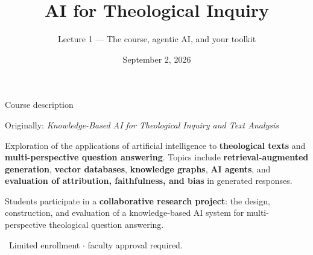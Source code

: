 


\title{AI for Theological Inquiry}
\subtitle{Lecture 1 — The course, agentic AI, and your toolkit}
\date{September 2, 2026}





\begin{frame}{Course description}
  \begin{center}\footnotesize\color{midgray}
    Originally: \emph{Knowledge-Based AI for Theological Inquiry and Text Analysis}
  \end{center}
  \vspace{4pt}
  \begin{calloutbox}[labnavy]
    \small
    Exploration of the applications of artificial intelligence to \textbf{theological
    texts} and \textbf{multi-perspective question answering}. Topics include
    \textcolor{cRAG}{\textbf{retrieval-augmented generation}},
    \textcolor{cRAG}{\textbf{vector databases}},
    \textcolor{cRAG}{\textbf{knowledge graphs}},
    \textcolor{cAgent}{\textbf{AI agents}}, and
    \textcolor{cEval}{\textbf{evaluation of attribution, faithfulness, and bias}}
    in generated responses.
  \end{calloutbox}
  \vspace{8pt}
  \begin{center}
  \begin{minipage}{0.9\textwidth}\small
    Students participate in a \textbf{collaborative research project}: the design,
    construction, and evaluation of a knowledge-based AI system for
    multi-perspective theological question answering.
  \end{minipage}
  \end{center}
  \vspace{8pt}
  \begin{center}\footnotesize\color{midgray}%
    \faLock\ Limited enrollment $\cdot$ faculty approval required.\end{center}
\end{frame}

